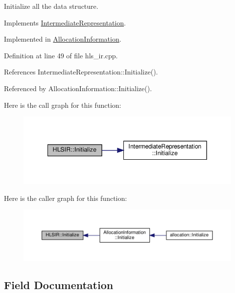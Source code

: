 Initialize all the data structure. 



Implements \hyperlink{classIntermediateRepresentation_ae09602bb8001b048690ce2a48347db36}{Intermediate\+Representation}.



Implemented in \hyperlink{classAllocationInformation_ad1263fb5b76f2dd97daacfcf3012f3e4}{Allocation\+Information}.



Definition at line 49 of file hls\+\_\+ir.\+cpp.



References Intermediate\+Representation\+::\+Initialize().



Referenced by Allocation\+Information\+::\+Initialize().

Here is the call graph for this function\+:
\nopagebreak
\begin{figure}[H]
\begin{center}
\leavevmode
\includegraphics[width=342pt]{d0/d25/classHLSIR_a37c3471e94bbb635d9fac51cca161225_cgraph}
\end{center}
\end{figure}
Here is the caller graph for this function\+:
\nopagebreak
\begin{figure}[H]
\begin{center}
\leavevmode
\includegraphics[width=350pt]{d0/d25/classHLSIR_a37c3471e94bbb635d9fac51cca161225_icgraph}
\end{center}
\end{figure}


\subsection{Field Documentation}
\mbox{\label{classHLSIR_a19d757a0d26d351ad3560310b981e2ac}} 
